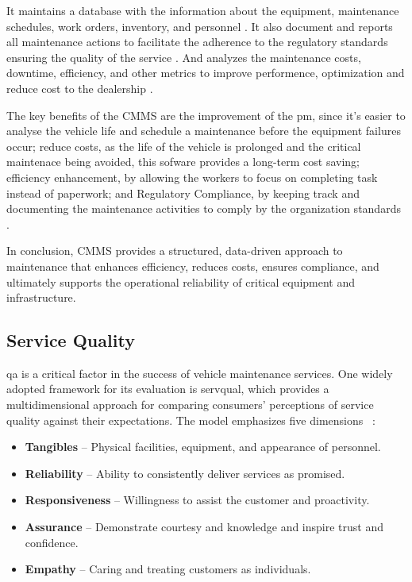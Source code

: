 It maintains a database with the information about the equipment, maintenance schedules, work orders, inventory, and personnel \cite{Labib_2008}. 
It also document and reports all maintenance actions to facilitate the adherence to the regulatory standards ensuring the quality of the service \cite{Ibm_2025a}. 
And analyzes the maintenance costs, downtime, efficiency, and other metrics to improve performence, optimization and reduce cost to the dealership \cite{Accruent_2025}.

The key benefits of the \ac{CMMS} are the improvement of the \acs{pm}, since it's easier to analyse the vehicle life and schedule a maintenance before the equipment failures occur; reduce costs, as the life of the vehicle is prolonged and the critical maintenace being avoided, this sofware provides a long-term cost saving; efficiency enhancement, by allowing the workers to focus on completing task instead of paperwork; and Regulatory Compliance, by keeping track and documenting the maintenance activities to comply by the organization standards \cite{Aptean_2023}. 

In conclusion, \ac{CMMS} provides a structured, data-driven approach to maintenance that enhances efficiency, reduces costs, ensures compliance, and ultimately supports the operational reliability of critical equipment and infrastructure.





\subsection{Service Quality}

\acs{qa} is a critical factor in the success of vehicle maintenance services. One widely adopted framework for its evaluation is \ac{servqual}, which provides a multidimensional approach for comparing consumers' perceptions of service quality against their expectations. The model emphasizes five dimensions ~\cite{SERVQUAL_OLD}:


\begin{itemize}
   \item \textbf{Tangibles} – Physical facilities, equipment, and appearance of personnel.
   \item \textbf{Reliability} – Ability to consistently deliver services as promised.
   \item \textbf{Responsiveness} – Willingness to assist the customer and proactivity.
   \item \textbf{Assurance} – Demonstrate courtesy and knowledge and inspire trust and confidence.
   \item \textbf{Empathy} – Caring and treating customers as individuals.
  \end{itemize}

